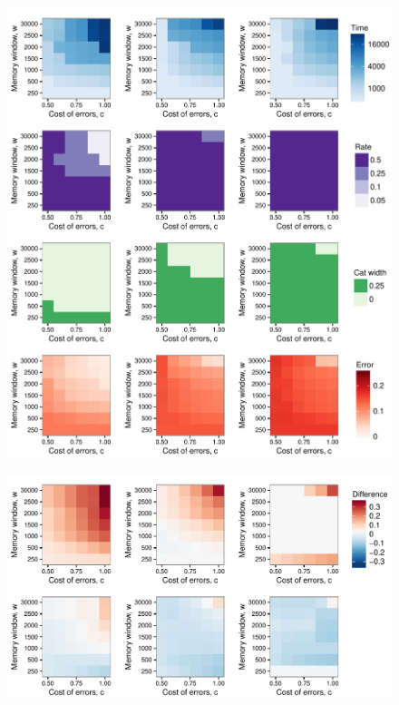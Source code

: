 \begin{figure}
\includegraphics[width=6.85in]{figures/strategies_heat_maps.pdf}
\caption{}
\end{figure}

\begin{figure}
\includegraphics[width=6.85in]{figures/recog_vs_learned_rule.pdf}
\caption{}
\end{figure}

